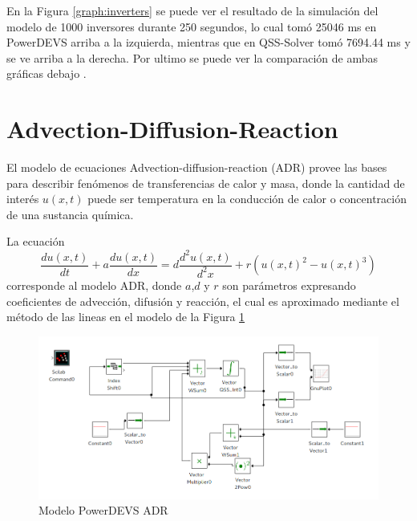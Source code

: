 En la Figura \ref{graph:inverters} se puede ver el resultado de la simulación del modelo de 1000 inversores durante 250 segundos, lo cual tomó 25046 ms en 
	PowerDEVS arriba a la izquierda, mientras que en QSS-Solver tomó 7694.44 ms y se ve arriba a la derecha. Por ultimo se puede ver la comparación de 
	ambas gráficas debajo	.	

\section{Advection-Diffusion-Reaction}
	El modelo de ecuaciones Advection-diffusion-reaction (ADR) provee las bases para describir fenómenos de transferencias de calor y masa, donde la cantidad de interés $u(x,t)$ puede ser temperatura en la conducción de calor o concentración de una sustancia química.

La ecuación 
\begin{equation*}
\frac{du(x,t)}{dt} + a \frac{du(x,t)}{dx} = d\frac{d^2u(x,t)}{d^2x} + r(u(x,t)^2 - u(x,t)^3)
\end{equation*}
corresponde al modelo ADR, donde $a$,$d$ y $r$ son parámetros expresando coeficientes de advección, difusión y reacción, 
el cual es aproximado mediante el método de las lineas \cite{BKP13} en el modelo de la Figura \ref{model:adr}

\begin{figure}[H]
 \includegraphics[width=0.75\linewidth]{adr-pwd}
\caption{Modelo PowerDEVS ADR}\label{model:adr}
\end{figure}


